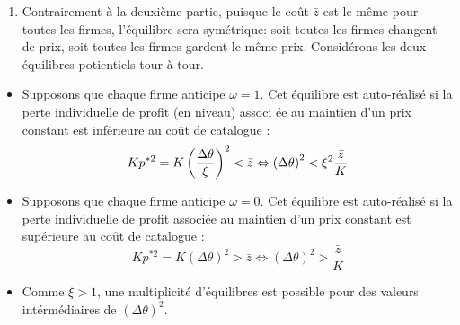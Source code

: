 \documentclass[11pt,a4paper]{article}
\begin{document}
\begin{enumerate}
\item 

Contrairement à la deuxième partie, puisque le coût $\bar{z} $ est le même pour toutes les firmes, l'équilibre sera symétrique: soit  toutes les firmes changent de prix, soit toutes les firmes gardent le même prix.  Consid\'{e}rons les deux \'{e}quilibres potientiels tour \`{a} tour.
\end{enumerate}

\begin{itemize}
\item Supposons que chaque firme anticipe $\omega =1$. Cet \'{e}quilibre est
auto-r\'{e}alis\'{e} si la perte individuelle de profit (en niveau) associ%
\'{e}e au maintien d'un prix constant est inf\'{e}rieure au co\^{u}t de
catalogue :%
\begin{equation*}
Kp^{\ast 2}=K\left( \frac{%
\Delta \theta}{\xi }\right) ^{2}<\bar{z}\Leftrightarrow \left( \Delta \theta\right)
^{2}<\xi ^{2}\frac{\bar{z}}{K}
\end{equation*}

\item Supposons que chaque firme anticipe $\omega =0$. Cet \'{e}quilibre est
auto-r\'{e}alis\'{e} si la perte individuelle de profit associ\'{e}e au
maintien d'un prix constant est sup\'{e}rieure au co\^{u}t de catalogue : 
\begin{equation*}
Kp^{\ast 2}=K\left( \Delta \theta\right) ^{2}>\bar{z}\Leftrightarrow \left(
\Delta \theta\right) ^{2}>\frac{\bar{z}}{K}
\end{equation*}

\item Comme $\xi >1$, une multiplicit\'{e} d'\'{e}quilibres est possible
pour des valeurs int\'{e}rm\'{e}diaires de $\left( \Delta \theta\right) ^{2}$.
\end{itemize}
\end{document}

